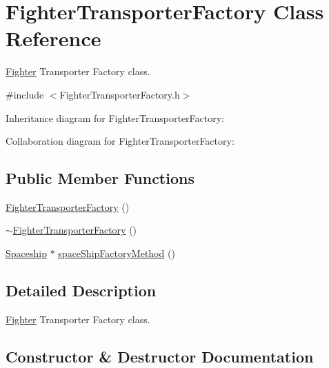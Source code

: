 \hypertarget{classFighterTransporterFactory}{}\section{Fighter\+Transporter\+Factory Class Reference}
\label{classFighterTransporterFactory}


\hyperlink{classFighter}{Fighter} Transporter Factory class.  




{\ttfamily \#include $<$Fighter\+Transporter\+Factory.\+h$>$}



Inheritance diagram for Fighter\+Transporter\+Factory\+:


Collaboration diagram for Fighter\+Transporter\+Factory\+:
\subsection*{Public Member Functions}
\begin{DoxyCompactItemize}
\item 
\hyperlink{classFighterTransporterFactory_a6491bf6c6026a412f38df451c0ba7899}{Fighter\+Transporter\+Factory} ()
\item 
\hyperlink{classFighterTransporterFactory_a1ed7e181f7c2ecbfc7b7e69c1085637f}{$\sim$\+Fighter\+Transporter\+Factory} ()
\item 
\hyperlink{classSpaceship}{Spaceship} $\ast$ \hyperlink{classFighterTransporterFactory_a599f35f61d2ccd5d6eb44d97540660f9}{space\+Ship\+Factory\+Method} ()
\end{DoxyCompactItemize}


\subsection{Detailed Description}
\hyperlink{classFighter}{Fighter} Transporter Factory class. 

\subsection{Constructor \& Destructor Documentation}
\mbox{\label{classFighterTransporterFactory_a6491bf6c6026a412f38df451c0ba7899}} 
